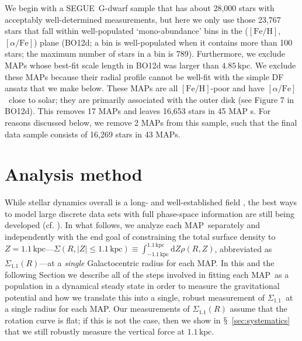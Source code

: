 \documentclass{emulateapj}
\newcommand{\dd}{\mathrm{d}}
\newcommand{\sectionname}{$\mathsection$}
\newcommand{\segue}{SEGUE}
\newcommand{\feh}{\ensuremath{[\mathrm{Fe/H}]}}
\newcommand{\afe}{\ensuremath{[\alpha\mathrm{/Fe}]}}
\newcommand{\map}{MAP}
\newcommand{\kpc}{\ensuremath{\,\mathrm{kpc}}}
\newcommand{\sigoneone}{\ensuremath{\Sigma_{1.1}}}
\newcommand{\bo}{BO12}
\begin{document}
We begin with a \segue\ G-dwarf sample that has about 28,000 stars
with acceptably well-determined measurements, but here we only use
those 23,767 stars that fall within well-populated `mono-abundance'
bins in the (\feh,\afe) plane (\bo d; a bin is well-populated when it
contains more than 100 stars; the maximum number of stars in a bin is
789). Furthermore, we exclude \map s whose best-fit scale length in
\bo d was larger than $4.85\kpc$. We exclude these \map s because
their radial profile cannot be well-fit with the simple DF ansatz that
we make below. These \map s are all \feh-poor and have \afe\ close to
solar; they are primarily associated with the outer disk (see Figure 7
in \bo d). This removes 17 \map s and leaves 16,653 stars in 45 \map
s. For reasons discussed below, we remove 2 \map s from this sample,
such that the final data sample consists of 16,269 stars in 43 \map s.


\section{Analysis method}\label{sec:method}

While stellar dynamics overall is a long- and well-established field
\citep{binneytremaine}, the best ways to model large discrete data
sets with full phase-space information are still being developed
(cf. \citealt{McMillan12a,Rix13a}). In what follows, we analyze each
\map\ separately and independently with the end goal of constraining
the total surface density to $Z= 1.1\kpc$---$\Sigma(R,|Z| \leq
1.1\kpc) \equiv \int_{-1.1\kpc}^{1.1\kpc}\dd Z \rho(R,Z)$, abbreviated
as $\sigoneone(R)$---at a \emph{single} Galactocentric radius for each
\map. In this and the following Section we describe all of the steps
involved in fitting each \map\ as a population in a dynamical steady
state in order to measure the gravitational potential and how we
translate this into a single, robust measurement of \sigoneone\ at a
single radius for each \map. Our measurements of $\sigoneone(R)$
assume that the rotation curve is flat; if this is not the case, then
we show in \sectionname~\ref{sec:systematics} that we still robustly
measure the vertical force at $1.1\kpc$.
\end{document}
